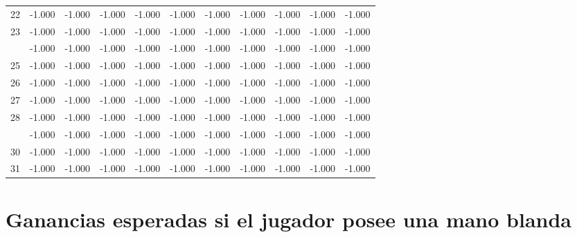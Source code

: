 \documentclass[12pt,a4paper,]{book}
\numberwithin{dummy}{section}
\theoremstyle{ocrenumbox}
\theoremstyle{blacknumex}
\theoremstyle{blacknumbox}
\theoremstyle{ocrenum}
\theoremstyle{ocrenum}
\begin{document}
\begin{longtable}[t]{lcccccccccc}
22 & -1.000 & -1.000 & -1.000 & -1.000 & -1.000 & -1.000 & -1.000 & -1.000 & -1.000 & -1.000\\
23 & -1.000 & -1.000 & -1.000 & -1.000 & -1.000 & -1.000 & -1.000 & -1.000 & -1.000 & -1.000\\
\addlinespace
24 & -1.000 & -1.000 & -1.000 & -1.000 & -1.000 & -1.000 & -1.000 & -1.000 & -1.000 & -1.000\\
25 & -1.000 & -1.000 & -1.000 & -1.000 & -1.000 & -1.000 & -1.000 & -1.000 & -1.000 & -1.000\\
26 & -1.000 & -1.000 & -1.000 & -1.000 & -1.000 & -1.000 & -1.000 & -1.000 & -1.000 & -1.000\\
27 & -1.000 & -1.000 & -1.000 & -1.000 & -1.000 & -1.000 & -1.000 & -1.000 & -1.000 & -1.000\\
28 & -1.000 & -1.000 & -1.000 & -1.000 & -1.000 & -1.000 & -1.000 & -1.000 & -1.000 & -1.000\\
\addlinespace
29 & -1.000 & -1.000 & -1.000 & -1.000 & -1.000 & -1.000 & -1.000 & -1.000 & -1.000 & -1.000\\
30 & -1.000 & -1.000 & -1.000 & -1.000 & -1.000 & -1.000 & -1.000 & -1.000 & -1.000 & -1.000\\
31 & -1.000 & -1.000 & -1.000 & -1.000 & -1.000 & -1.000 & -1.000 & -1.000 & -1.000 & -1.000\\
\bottomrule
\end{longtable}
\endgroup{}

\hypertarget{ganancias-esperadas-si-el-jugador-posee-una-mano-blanda}{%
\section{Ganancias esperadas si el jugador posee una mano
blanda}\label{ganancias-esperadas-si-el-jugador-posee-una-mano-blanda}}

\begingroup\fontsize{12}{14}\selectfont
\end{document}

